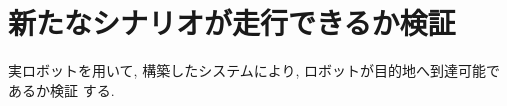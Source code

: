 \chapter{新たなシナリオが走行できるか検証}
\label{chap:experiment}
実ロボットを用いて, 構築したシステムにより, ロボットが目的地へ到達可能であるか検証
する.



